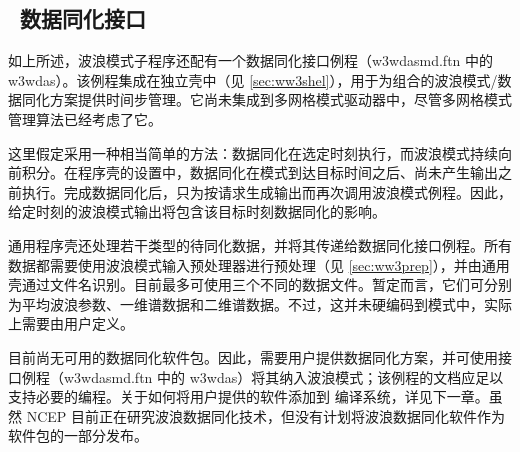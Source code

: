 \vssub
\subsection{~数据同化接口} \label{sec:das}
\vssub

如上所述，波浪模式子程序还配有一个数据同化接口例程（{\file w3wdasmd.ftn} 中的 {\F w3wdas}）。该例程集成在独立壳中（见 \para\ref{sec:ww3shel}），用于为组合的波浪模式/数据同化方案提供时间步管理。它尚未集成到多网格模式驱动器中，尽管多网格模式管理算法已经考虑了它。

这里假定采用一种相当简单的方法：数据同化在选定时刻执行，而波浪模式持续向前积分。在程序壳的设置中，数据同化在模式到达目标时间之后、尚未产生输出之前执行。完成数据同化后，只为按请求生成输出而再次调用波浪模式例程。因此，给定时刻的波浪模式输出将包含该目标时刻数据同化的影响。

通用程序壳还处理若干类型的待同化数据，并将其传递给数据同化接口例程。所有数据都需要使用波浪模式输入预处理器进行预处理（见 \para\ref{sec:ww3prep}），并由通用壳通过文件名识别。目前最多可使用三个不同的数据文件。暂定而言，它们可分别为平均波浪参数、一维谱数据和二维谱数据。不过，这并未硬编码到模式中，实际上需要由用户定义。

目前尚无可用的数据同化软件包。因此，需要用户提供数据同化方案，并可使用接口例程（{\file w3wdasmd.ftn} 中的 {\F w3wdas}）将其纳入波浪模式；该例程的文档应足以支持必要的编程。关于如何将用户提供的软件添加到 \ws{} 编译系统，详见下一章。虽然 NCEP 目前正在研究波浪数据同化技术，但没有计划将波浪数据同化软件作为 \ws{} 软件包的一部分发布。
